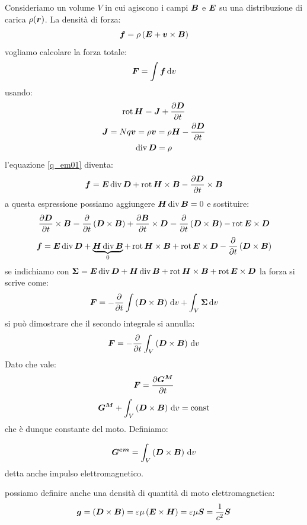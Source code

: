 Consideriamo un volume $V$ in cui agiscono i campi $\boldsymbol{B}$ e $\boldsymbol{E}$ su una distribuzione di carica $\rho(\boldsymbol{r})$. La densità di forza:
\begin{equation}
\boldsymbol{f}=\rho\left(\boldsymbol{E}+\boldsymbol{v}\times\boldsymbol{B}\right)
\label{q_em01}
\end{equation}
vogliamo calcolare la forza totale:
\begin{equation}
\boldsymbol{F}=\int \boldsymbol{f}\,\mathrm{d} v
\end{equation}
usando:
\begin{gather}
\operatorname{rot}\boldsymbol{H}=\boldsymbol{J}+\frac{\partial \boldsymbol{D}}{\partial t}\\
\boldsymbol{J}=Nq\boldsymbol{v}=\rho\boldsymbol{v}=\rho\boldsymbol{H}-\frac{\partial\boldsymbol{D}}{\partial t}\\
\operatorname{div}\boldsymbol{D}=\rho
\end{gather}
l'equazione \eqref{q_em01} diventa:
\begin{equation}
\boldsymbol{f}=\boldsymbol{E}\operatorname{div}\boldsymbol{D}+\operatorname{rot}\boldsymbol{H}\times\boldsymbol{B}-\frac{\partial\boldsymbol{D}}{\partial t}\times\boldsymbol{B}
\end{equation}
a questa espressione possiamo aggiungere $\boldsymbol{H}\operatorname{div}\boldsymbol{B}=0$ e sostituire:
\begin{equation}
\frac{\partial\boldsymbol{D}}{\partial t}\times\boldsymbol{B}=\frac{\partial}{\partial t}\left(\boldsymbol{D}\times\boldsymbol{B}\right)+\frac{\partial\boldsymbol{B}}{\partial t}\times\boldsymbol{D}=\frac{\partial}{\partial t}\left(\boldsymbol{D}\times\boldsymbol{B}\right)-\operatorname{rot}\boldsymbol{E}\times\boldsymbol{D}
\end{equation}
\begin{equation}
\boldsymbol{f}=\boldsymbol{E}\operatorname{div}\boldsymbol{D}+\underbrace{\boldsymbol{H}\operatorname{div}\boldsymbol{B}}_{0}+\operatorname{rot}\boldsymbol{H}\times\boldsymbol{B}+\operatorname{rot}\boldsymbol{E}\times\boldsymbol{D}-\frac{\partial}{\partial t}\left(\boldsymbol{D}\times\boldsymbol{B}\right)
\end{equation}
se indichiamo con $\boldsymbol{\Sigma}=\boldsymbol{E}\operatorname{div}\boldsymbol{D}+\boldsymbol{H}\operatorname{div}\boldsymbol{B}+\operatorname{rot}\boldsymbol{H}\times\boldsymbol{B}+\operatorname{rot}\boldsymbol{E}\times\boldsymbol{D}$ la forza si scrive come:
\begin{equation}
\boldsymbol{F}=-\frac{\partial}{\partial t}\int\left(\boldsymbol{D}\times\boldsymbol{B}\right)\,\mathrm{d} v+\int_V\boldsymbol{\Sigma}\,\mathrm{d} v
\end{equation}
si può dimostrare che il secondo integrale si annulla:
\begin{equation}
\boldsymbol{F}=-\frac{\partial}{\partial t}\int_V\left(\boldsymbol{D}\times\boldsymbol{B}\right)\,\mathrm{d} v
\end{equation}
Dato che vale:
\begin{equation}
\boldsymbol{F}=\frac{\partial\boldsymbol{G^M}}{\partial t}
\end{equation}
\begin{equation}
\boldsymbol{G^M}+\int_V\left(\boldsymbol{D}\times\boldsymbol{B}\right)\,\mathrm{d} v=\boldsymbol{\text{const}}
\end{equation}
che è dunque constante del moto. Definiamo:
\begin{Def}
\begin{equation}
\boldsymbol{G^{em}}=\int_V\left(\boldsymbol{D}\times\boldsymbol{B}\right)\,\mathrm{d} v
\end{equation}
detta anche impulso elettromagnetico.
\end{Def}
possiamo definire anche una densità di quantità di moto elettromagnetica:
\begin{equation}
\boldsymbol{g}=\left(\boldsymbol{D}\times\boldsymbol{B}\right)=\varepsilon\mu\left(\boldsymbol{E}\times\boldsymbol{H}\right)=\varepsilon\mu\boldsymbol{S}=\frac{1}{c^2}\boldsymbol{S}
\end{equation}
